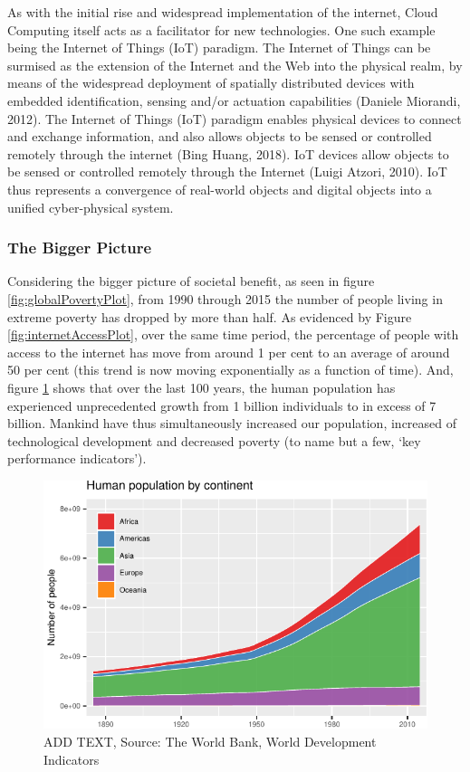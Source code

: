 \documentclass[11pt,]{article}
\begin{document}
As with the initial rise and widespread implementation of the internet,
Cloud Computing itself acts as a facilitator for new technologies. One
such example being the Internet of Things (IoT) paradigm. The Internet
of Things can be surmised as the extension of the Internet and the Web
into the physical realm, by means of the widespread deployment of
spatially distributed devices with embedded identification, sensing
and/or actuation capabilities (Daniele Miorandi, 2012). The Internet of
Things (IoT) paradigm enables physical devices to connect and exchange
information, and also allows objects to be sensed or controlled remotely
through the internet (Bing Huang, 2018). IoT devices allow objects to be
sensed or controlled remotely through the Internet (Luigi Atzori, 2010).
IoT thus represents a convergence of real-world objects and digital
objects into a unified cyber-physical system.

\hypertarget{the-bigger-picture}{%
\subsubsection{The Bigger Picture}\label{the-bigger-picture}}

Considering the bigger picture of societal benefit, as seen in figure
\ref{fig:globalPovertyPlot}, from 1990 through 2015 the number of people
living in extreme poverty has dropped by more than half. As evidenced by
Figure \ref{fig:internetAccessPlot}, over the same time period, the
percentage of people with access to the internet has move from around 1
per cent to an average of around 50 per cent (this trend is now moving
exponentially as a function of time). And, figure
\ref{fig:populationGrowthPlot} shows that over the last 100 years, the
human population has experienced unprecedented growth from 1 billion
individuals to in excess of 7 billion. Mankind have thus simultaneously
increased our population, increased of technological development and
decreased poverty (to name but a few, `key performance indicators').

\begin{figure}[H]

{\centering \includegraphics{MD_Final_files/figure-latex/populationGrowthPlot-1} 

}

\caption{ADD TEXT, Source: The World Bank, World Development Indicators}\label{fig:populationGrowthPlot}
\end{figure}
\end{document}
